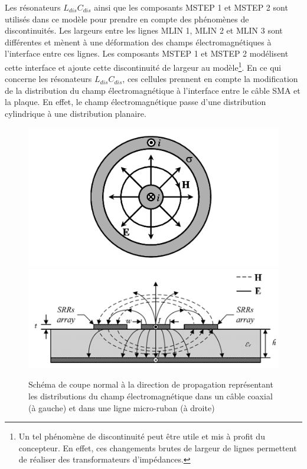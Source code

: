 \documentclass[french]{article}
\begin{document}
Les résonateurs $L_{dis}C_{dis}$ ainsi que les composants MSTEP 1 et MSTEP 2 sont utilisés dans ce modèle pour prendre en compte des phénomènes de discontinuités. Les largeurs entre les lignes MLIN 1, MLIN 2 et MLIN 3 sont différentes et mènent à une déformation des champs électromagnétiques à l'interface entre ces lignes. Les composants MSTEP 1 et MSTEP 2 modélisent cette interface et ajoute cette discontinuité de largeur au modèle\footnote{Un tel phénomène de discontinuité peut être utile et mis à profit du concepteur. En effet, ces changements brutes de largeur de lignes permettent de réaliser des transformateurs d'impédances.}. En ce qui concerne les résonateurs $L_{dis}C_{dis}$, ces cellules prennent en compte la modification de la distribution du champ électromagnétique à l'interface entre le câble SMA et la plaque. En effet, le champ électromagnétique passe d'une distribution cylindrique à une distribution planaire.


\begin{figure}[H]
	\centering
	\includegraphics[scale=0.8]{ressources/electromagnetic_distribution_coaxial.png}
	\includegraphics[scale=0.5]{ressources/electromagnetic_distribution_microstrip.png}
	\caption{Schéma de coupe normal à la direction de propagation représentant les distributions du champ électromagnétique dans un câble coaxial (à gauche) et dans une ligne micro-ruban (à droite)}
	\label{fig:schema_distribution_EOM}
\end{figure}
\end{document}

